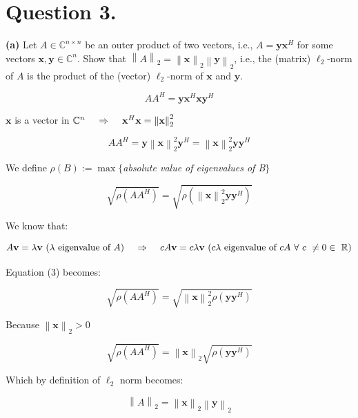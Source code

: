 \documentclass[a4paper,11pt]{article}
\newcommand\tab[1][4mm]{\hspace*{#1}}
\newcommand{\norm}[1]{\left\lVert #1 \right\rVert}
\begin{document}
\section*{Question 3.}
\setcounter{equation}{0}
\textbf{(a)} Let $A \in \mathbb{C}^{n\times n} $ be an outer product of two vectors, i.e., $A=\mathbf{y}\mathbf{x}^H$ for some vectors $\mathbf{x},\mathbf{y}\in \mathbb{C}^n$. Show that $\norm{A}_2=\norm{\mathbf{x}}_2 \norm{\mathbf{y}}_2$, i.e., the (matrix) $\ell_2$-norm of $A$ is the product of the (vector) $\ell_2$-norm of $\mathbf{x}$ and $\mathbf{y}$.
\begin{margin}{0.5cm}{0.5cm}
	\begin{equation}
		AA^H = \mathbf{y}\mathbf{x}^H\mathbf{x}\mathbf{y}^H
	\end{equation}
	
	$\mathbf{x}$ is a vector in $\mathbb{C}^n \tab \Rightarrow \tab \mathbf{x}^H\mathbf{x} = \norm{\mathbf{x}}^2_2 \tab$
	
	\begin{equation}
		AA^H = \mathbf{y}\norm{\mathbf{x}}^2_2\mathbf{y}^H = \norm{\mathbf{x}}^2_2\mathbf{y}\mathbf{y}^H
	\end{equation}
	
	We define $\rho(B) := \max\{$\textit{absolute value of eigenvalues of B}$\}$
	
	\begin{equation}
		\sqrt{\rho(AA^H)} = \sqrt{\rho(\norm{\mathbf{x}}^2_2\mathbf{y}\mathbf{y}^H)}
	\end{equation}
	
	We know that:
	
	\begin{equation*}
		A\mathbf{v}=\lambda\mathbf{v}\ (\lambda \text{ eigenvalue of } A)\tab\Rightarrow\tab cA\mathbf{v}=c\lambda\mathbf{v}\	 (c\lambda \text{ eigenvalue of } cA\ \forall\ c\ \ne 0 \in\ \mathbb{R})
	\end{equation*}
	
	Equation (3) becomes:
	
	\begin{equation}
		\sqrt{\rho(AA^H)} = \sqrt{\norm{\mathbf{x}}^2_2\rho(\mathbf{y}\mathbf{y}^H)}
	\end{equation}
	
	Because $\norm{\mathbf{x}}_2 > 0$
	
	\begin{equation}
		\sqrt{\rho(AA^H)} = \norm{\mathbf{x}}_2\sqrt{\rho(\mathbf{y}\mathbf{y}^H)}
	\end{equation}
	
	Which by definition of $\ell_2$ norm becomes:
	
	\begin{equation}
		\norm{A}_2 = \norm{\mathbf{x}}_2\norm{\mathbf{y}}_2
	\end{equation}
	\\
\end{margin}
\end{document}
